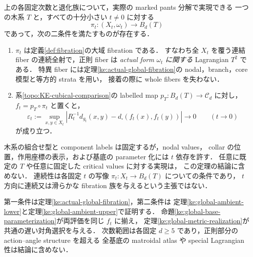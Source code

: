 \begin{theorem}
\label{ke:global-realization}
上の各固定次数と退化族について，実際の marked pants 分解で実現できる
一つの木系 $T$ と，すべての十分小さい $t\ne0$ に対する
\[
 \pi_t:(X_t,\omega_t)\longrightarrow B_d(T)
\]
であって，次の二条件を満たすものが存在する．
\begin{enumerate}
\item $\pi_t$ は定義\ref{def:fibration}の大域 fibration である．
すなわち全 $X_t$ を覆う連結 fiber の連続全射で，正則 fiber は
\emph{actual form $\omega_t$ に関する} Lagrangian $T^2$ である．
特異 fiber には定理\ref{ke:actual-global-fibration}の nodal，branch，core 模型と等方的 strata を用い，
接着の際に whole fibers を失わない．
\item 系\ref{topo:KE-cubical-comparison}の labelled map
$p_T:B_d(T)\to\mathcal C_d$ に対し，$f_t=p_T\circ\pi_t$ と置くと，
\begin{equation}\label{ke:eq:global-realization-distortion}
 \varepsilon_t:=
 \sup_{x,y\in X_t}
 \left|R_t^{-1}d_{g_t}(x,y)
              -d_\square(f_t(x),f_t(y))\right|
 \longrightarrow0
 \qquad(t\longrightarrow0)
\end{equation}
が成り立つ．
\end{enumerate}
木系の組合せ型と component labels は固定するが，nodal values，
collar の位置，作用座標の表示，および基底の parameter 化には $t$ 依存を許す．
任意に既定の $T$ や任意に固定した critical values に対する実現は，
この定理の結論に含めない．
連続性は各固定 $t$ の写像 $\pi_t:X_t\to B_d(T)$ についての条件であり，
$t$ 方向に連続又は滑らかな fibration 族を与えるという主張ではない．
\end{theorem}

第一条件は定理\ref{ke:actual-global-fibration}，第二条件は
定理\ref{ke:global-ambient-lower}と定理\ref{ke:global-ambient-upper}で証明する．
命題\ref{ke:global-base-parameterization}が両評価を同じ $f_t$ に揃え，
定理\ref{ke:global-metric-realization}が共通の遅い対角選択を与える．
次数範囲は各固定 $d\ge5$ であり，正則部分の action--angle structure を超える
全基底の matroidal atlas や special Lagrangian 性は結論に含めない．


